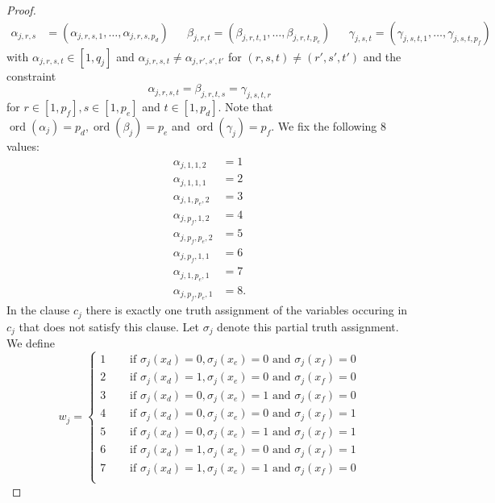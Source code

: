 \documentclass{article}
\DeclareMathOperator{\ord}{ord}
\begin{document}
\begin{proof}
\begin{align*}
\alpha_{j,r,s}&= (\alpha_{j,r,s,1},\dots,\alpha_{j,r,s,p_d}) && \beta_{j,r,t} = (\beta_{j,r,t,1},\dots,\beta_{j,r,t,p_e}) && \gamma_{j,s,t} = (\gamma_{j,s,t,1},\dots,\gamma_{j,s,t,p_f})
\end{align*}
with $\alpha_{j,r,s,t} \in [1,q_j]$ and $\alpha_{j,r,s,t} \neq \alpha_{j,r',s',t'}$ for $(r,s,t) \neq (r',s',t')$ and the constraint
\begin{equation}\label{alphabetagammaconstraint}
\alpha_{j,r,s,t} = \beta_{j,r,t,s} = \gamma_{j,s,t,r}
\end{equation}
for $r \in [1,p_f], s \in [1,p_e]$ and $t \in [1,p_d]$. Note that $\ord(\alpha_j)=p_d,\ord(\beta_j)=p_e$ and $\ord(\gamma_j)=p_f$. We fix the following $8$ values:
\begin{equation}\label{fixedvalues}
\begin{split}
\alpha_{j,1,1,2}&= 1\\
\alpha_{j,1,1,1}&= 2\\
\alpha_{j,1,p_e,2}&= 3\\
\alpha_{j,p_f,1,2}&= 4\\
\alpha_{j,p_f,p_e,2}&= 5\\
\alpha_{j,p_f,1,1}&= 6\\
\alpha_{j,1,p_e,1}&= 7\\
\alpha_{j,p_f,p_e,1}&= 8.
\end{split}
\end{equation}
In the clause $c_j$ there is exactly one truth assignment of the variables occuring in $c_j$ that does not satisfy this clause. Let $\sigma_j$ denote this partial truth assignment. We define
\begin{displaymath}
w_j = \begin{cases}
1 & \text{~~~~if } \sigma_j(x_d)=0, \sigma_j(x_e)=0 \text{ and } \sigma_j(x_f)=0\\
2 & \text{~~~~if } \sigma_j(x_d)=1, \sigma_j(x_e)=0 \text{ and } \sigma_j(x_f)=0\\
3 & \text{~~~~if } \sigma_j(x_d)=0, \sigma_j(x_e)=1 \text{ and } \sigma_j(x_f)=0\\
4 & \text{~~~~if } \sigma_j(x_d)=0, \sigma_j(x_e)=0 \text{ and } \sigma_j(x_f)=1\\
5 & \text{~~~~if } \sigma_j(x_d)=0, \sigma_j(x_e)=1 \text{ and } \sigma_j(x_f)=1\\
6 & \text{~~~~if } \sigma_j(x_d)=1, \sigma_j(x_e)=0 \text{ and } \sigma_j(x_f)=1\\
7 & \text{~~~~if } \sigma_j(x_d)=1, \sigma_j(x_e)=1 \text{ and } \sigma_j(x_f)=0\\

\end{cases}
\end{displaymath}
\end{proof}
\end{document}
